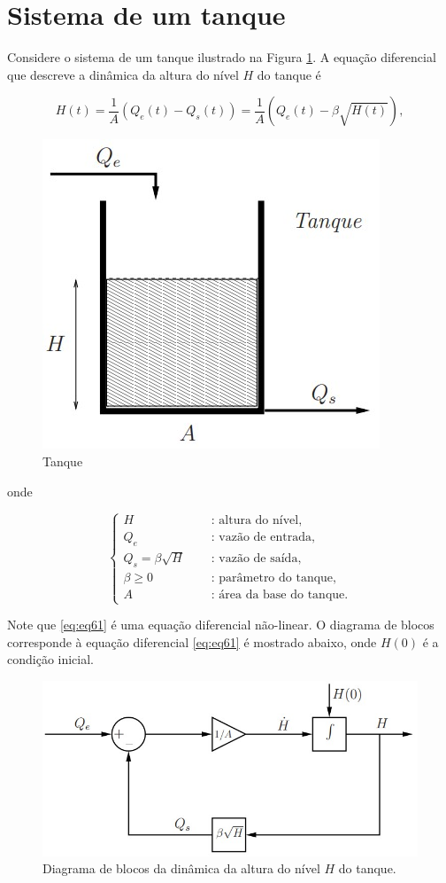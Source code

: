 \documentclass[
]{book}
\theoremstyle{definition}
\theoremstyle{definition}
\theoremstyle{definition}
\theoremstyle{remark}
\begin{document}
\hypertarget{sistema-de-um-tanque}{%
\section{Sistema de um tanque}\label{sistema-de-um-tanque}}

Considere o sistema de um tanque ilustrado na Figura \ref{fig:fig61}. A equação diferencial que descreve a dinâmica da altura do nível \(H\) do tanque é

\[
H(t) = \frac{1}{A}(Q_e(t)-Q_s(t)) = \boxed{\frac{1}{A}(Q_e(t)-\beta\sqrt{H(t)})}, \label{eq:eq61}
\]

\begin{figure}

{\centering \includegraphics[width=0.5\linewidth]{Imagens/Lab6/Apresentação/fig1} 

}

\caption{Tanque}\label{fig:fig61}
\end{figure}

onde

\[
  \begin{cases}
    H & \quad \text{ : altura do nível,}\\
    Q_e & \quad \text{ : vazão de entrada,}\\
    Q_s = \beta\sqrt{H} & \quad \text{ : vazão de saída,}\\
    \beta \geq 0 & \quad \text{ : parâmetro do tanque,}\\
    A & \quad \text{ : área da base do tanque.}
  \end{cases}
\]

Note que \eqref{eq:eq61} é uma equação diferencial não-linear. O diagrama de blocos corresponde à equação diferencial \eqref{eq:eq61} é mostrado abaixo, onde \(H(0)\) é a condição inicial.

\begin{figure}

{\centering \includegraphics[width=0.5\linewidth]{Imagens/Lab6/Apresentação/fig2} 

}

\caption{Diagrama de blocos da dinâmica da altura do nível $H$ do tanque.}\label{fig:fig62}
\end{figure}
\end{document}
